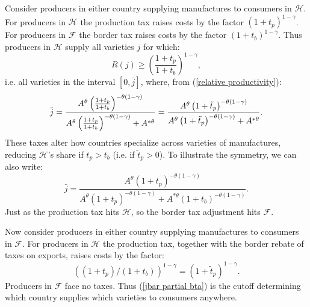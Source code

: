 \documentclass[notitlepage,12pt]{article}
\begin{document}
Consider producers in either country supplying manufactures to consumers in $%
\mathcal{H}$. For producers in $\mathcal{H}$ the production tax raises costs
by the factor $(1+t_{p})^{1-\gamma }$. For producers in $\mathcal{F}$ the
border tax raises costs by the factor $(1+t_{b})^{1-\gamma }$. Thus
producers in $\mathcal{H}$ supply all varieties $j$ for which:%
\begin{equation*}
R(j)\geq \left( \frac{1+t_{p}}{1+t_{b}}\right) ^{1-\gamma },
\end{equation*}%
i.e. all varieties in the interval $[0,\bar{j}]$, where, from (\ref{relative
productivity}):%
\begin{equation}
\bar{j}=\frac{A^{\theta }\left( \frac{1+t_{p}}{1+t_{b}}\right) ^{-\theta
\left( 1-\gamma \right) }}{A^{\theta }\left( \frac{1+t_{p}}{1+t_{b}}\right)
^{-\theta \left( 1-\gamma \right) }+A^{\ast \theta }}=\frac{A^{\theta
}\left( 1+\tilde{t}_{p}\right) ^{-\theta \left( 1-\gamma \right) }}{%
A^{\theta }\left( 1+\tilde{t}_{p}\right) ^{-\theta \left( 1-\gamma \right)
}+A^{\ast \theta }}.  \label{jbar partial bta}
\end{equation}%
These taxes alter how countries specialize across varieties of manufactures,
reducing $\mathcal{H}$'s share if $t_{p}>t_{b}$ (i.e. if $\tilde{t}_{p}>0$).
To illustrate the symmetry, we can also write:%
\begin{equation*}
\bar{j}=\frac{A^{\theta }\left( 1+t_{p}\right) ^{-\theta \left( 1-\gamma
\right) }}{A^{\theta }\left( 1+t_{p}\right) ^{-\theta \left( 1-\gamma
\right) }+A^{\ast \theta }\left( 1+t_{b}\right) ^{-\theta \left( 1-\gamma
\right) }}.
\end{equation*}%
Just as the production tax hits $\mathcal{H}$, so the border tax adjustment
hits $\mathcal{F}$.

Now consider producers in either country supplying manufactures to consumers
in $\mathcal{F}$. For producers in $\mathcal{H}$ the production tax,
together with the border rebate of taxes on exports, raises costs by the
factor:%
\begin{equation*}
\left( (1+t_{p})/(1+t_{b})\right) ^{1-\gamma }=\left( 1+\tilde{t}_{p}\right)
^{1-\gamma }.
\end{equation*}%
Producers in $\mathcal{F}$ face no taxes. Thus (\ref{jbar partial bta}) is
the cutoff determining which country supplies which varieties to consumers
anywhere.
\end{document}
